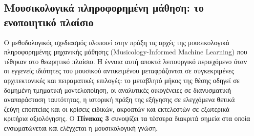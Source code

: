\documentclass[11pt,a4paper]{article}
\begin{document}
\subsection{Μουσικολογικά πληροφορημένη μάθηση: το ενοποιητικό πλαίσιο}\label{ux3bcux3bfux3c5ux3c3ux3b9ux3baux3bfux3bbux3bfux3b3ux3b9ux3baux3ac-ux3c0ux3bbux3b7ux3c1ux3bfux3c6ux3bfux3c1ux3b7ux3bcux3adux3bdux3b7-ux3bcux3acux3b8ux3b7ux3c3ux3b7-ux3c4ux3bf-ux3b5ux3bdux3bfux3c0ux3bfux3b9ux3b7ux3c4ux3b9ux3baux3cc-ux3c0ux3bbux3b1ux3afux3c3ux3b9ux3bf}

Ο μεθοδολογικός σχεδιασμός υλοποιεί στην πράξη τις αρχές της μουσικολογικά πληροφορημένης μηχανικής μάθησης (Musicology-Informed Machine Learning) που τέθηκαν στο θεωρητικό πλαίσιο. Η έννοια αυτή αποκτά λειτουργικό περιεχόμενο όταν οι εγγενείς ιδιότητες του μουσικού αντικειμένου μεταφράζονται σε συγκεκριμένες αρχιτεκτονικές και πειραματικές επιλογές: το μεταβλητό μήκος της θέσης οδηγεί σε δομημένη τμηματική μοντελοποίηση, οι αναλυτικές οικογένειες σε διανυσματική αναπαράσταση ταυτότητας, η ιστορική πράξη της εξήγησης σε ελεγχόμενα θετικά ζεύγη εποπτείας και οι κρίσεις ειδικών, ακροατών και εκτελεστών σε εξωτερικά κριτήρια αξιολόγησης. Ο \textbf{Πίνακας 3} συνοψίζει τα τέσσερα διακριτά σημεία στα οποία ενσωματώνεται και ελέγχεται η μουσικολογική γνώση.
\end{document}

